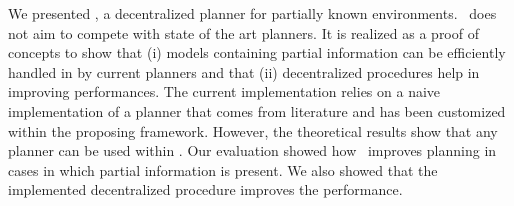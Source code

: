 We presented  \toolName, a  decentralized planner for partially known environments.
\toolName\ does not aim to compete with state of the art planners.
It is realized as a proof of concepts to show that (i) models containing partial information can be efficiently handled in by current planners and that (ii) decentralized procedures help in improving performances.
The current implementation relies on a naive implementation of a planner that comes from literature and has been customized within the proposing framework.
However, the theoretical results show that  any planner can be used within \toolName.
Our evaluation showed how  \toolName\ improves planning in cases in which partial information is present.
We also showed that the implemented decentralized procedure improves the performance.

